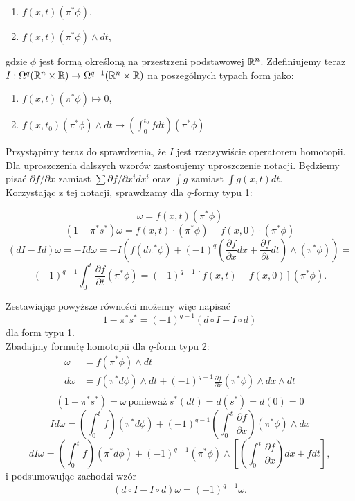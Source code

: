 \documentclass[licencjacka]{pracamgr}
\theoremstyle{definition}
\theoremstyle{definition}
\theoremstyle{plain}
\theoremstyle{plain}
\theoremstyle{plain}
\theoremstyle{plain}
\theoremstyle{plain}
\def\R{\ensuremath\mathbb{R}}
\begin{document}
\begin{enumerate}
    \item $ f(x,t) (\pi^\ast \phi)$, 
    \item $f(x,t) (\pi^\ast \phi) \wedge dt $,
\end{enumerate}
gdzie $\phi$ jest formą określoną na przestrzeni podstawowej $\R^n$.
Zdefiniujemy teraz
$I: \Omega^{q} (\R^n \times \R) \rightarrow \Omega^{q-1} (\R^n \times \R)$ 
na poszególnych typach form jako:
\begin{enumerate}
    \item $f(x,t) (\pi^\ast \phi) \mapsto 0$,
    \item $f(x, t_0) (\pi^\ast \phi) \wedge dt \mapsto (\int_0^{t_0} f dt) (\pi^\ast \phi) $
\end{enumerate}
Przystąpimy teraz do sprawdzenia, że $I$ jest rzeczywiście operatorem homotopii.
Dla uproszczenia dalszych wzorów zastosujemy uproszczenie notacji. Będziemy
pisać $\partial f / \partial x$ zamiast $\sum \partial f / \partial x^i dx^i$
oraz $\int g$ zamiast $\int g(x, t) dt$. \\

Korzystając z tej notacji, sprawdzamy dla $q$-formy typu 1:

\[
    \omega = f(x,t)(\pi^\ast \phi)
\]
\[
    (1 - \pi^\ast s^\ast) \omega =
         f(x,t) \cdot (\pi^\ast \phi) -   f(x,0) \cdot (\pi^\ast \phi)
\]
\[
    (dI - Id) \omega = - I d\omega = 
    -I \left(
    f (d \pi^\ast \phi) +
    (-1)^q \left(
       \frac{\partial f}{\partial x} dx +
       \frac{\partial f}{\partial t} dt
       \right) \wedge
      (\pi^\ast \phi)
    \right) =
\]
\[
     (-1)^{q-1} \int_0^t \frac{\partial f}{\partial t} (\pi^\ast \phi)
    = (-1)^{q-1}  [f(x,t) - f(x,0)] (\pi^\ast \phi).
\]

Zestawiając powyższe równości możemy więc napisać
\[
    1 - \pi^\ast s^\ast = (-1)^{q-1}(d \circ I - I \circ d)
\]
dla form typu 1. \\

Zbadajmy formułę homotopii dla $q$-form typu 2:
\begin{align*}
     \omega &= f (\pi^\ast \phi) \wedge dt \\
    d\omega &= f(\pi^\ast d \phi) \wedge dt + 
      (-1)^{q-1} \frac{\partial f}{\partial x} 
       (\pi^\ast \phi) \wedge dx \wedge dt \\
\end{align*}
\[
    (1 - \pi^\ast s^\ast) = \omega ~\text{ponieważ}~
     s^\ast(dt) = d(s^\ast) = d(0) = 0
\]
\[
    Id\omega =  \left( \int_0^t f \right) (\pi^\ast d\phi) +
      (-1)^{q-1}
      (\int_0^t \frac{\partial f}{\partial x})
      (\pi^\ast \phi) \wedge dx 
\]
\[
    dI\omega = \left( \int_0^tf \right) (\pi^\ast d\phi) +
      (-1)^{q-1} (\pi^\ast \phi)  \wedge
      \left[
          (\int_0^t \frac{\partial f}{\partial x}) dx
          + f dt
      \right],
\]
i podsumowując zachodzi wzór
\[
    (d \circ I - I \circ d) \omega = (-1)^{q-1} \omega.
\]
\end{document}
